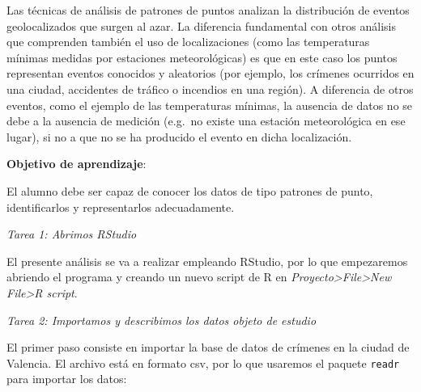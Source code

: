 \documentclass[
]{report}
\theoremstyle{definition}
\theoremstyle{definition}
\theoremstyle{definition}
\theoremstyle{definition}
\theoremstyle{remark}
\begin{document}
Las técnicas de análisis de patrones de puntos analizan la distribución de
eventos geolocalizados que surgen al azar. La diferencia fundamental con otros
análisis que comprenden también el uso de localizaciones (como las temperaturas
mínimas medidas por estaciones meteorológicas) es que en este caso los puntos
representan eventos conocidos y aleatorios (por ejemplo, los crímenes ocurridos
en una ciudad, accidentes de tráfico o incendios en una región). A diferencia de
otros eventos, como el ejemplo de las temperaturas mínimas, la ausencia de datos
no se debe a la ausencia de medición (e.g.~no existe una estación meteorológica
en ese lugar), si no a que no se ha producido el evento en dicha localización.

\textbf{Objetivo de aprendizaje}:

El alumno debe ser capaz de conocer los datos de tipo patrones de punto,
identificarlos y representarlos adecuadamente.

\emph{Tarea 1: Abrimos RStudio}

El presente análisis se va a realizar empleando RStudio, por lo que empezaremos
abriendo el programa y creando un nuevo script de R en \emph{Proyecto\textgreater File\textgreater New File\textgreater R
script}.

\emph{Tarea 2: Importamos y describimos los datos objeto de estudio}

El primer paso consiste en importar la base de datos de crímenes en la ciudad de
Valencia. El archivo está en formato csv, por lo que usaremos el paquete \texttt{readr}
para importar los datos:
\end{document}
